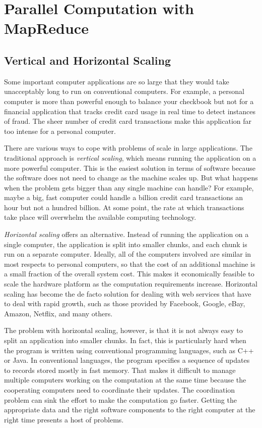 \chapter{Parallel Computation with MapReduce}

\section{Vertical and Horizontal Scaling}

Some important computer applications are so large that they would take
unacceptably long to run on conventional computers.  For
example, a personal computer is more than powerful enough
to balance your checkbook but not for a financial
application that tracks credit card usage in real time to
detect instances of fraud.  The sheer number of credit card
transactions make this application far too intense for a
personal computer.

There are various ways to cope
with problems of scale  in large applications.
The traditional approach is
\emph{vertical scaling},
which means running the
application on a more powerful computer.
This is the easiest solution in terms of software
because the software does not need to change as the machine scales up.
But what happens when the problem gets bigger than any single machine can handle?
For example, maybe a big, fast computer could handle
a billion credit card transactions an hour
but not a hundred billion.
At some point, the rate at which transactions take place
will overwhelm the available computing technology.

\emph{Horizontal scaling}
offers an alternative.  Instead of
running the application on a single computer,
the application is split into smaller
chunks, and each chunk is run on a separate computer.
Ideally, all of the computers involved are similar in most respects
to personal computers, so that the cost of an additional
machine is a small fraction of the overall system cost.
This makes it economically feasible to scale the
hardware platform as the computation requirements increase.
Horizontal scaling has become the de facto
solution for dealing with web services that have to deal
with rapid growth, such as those provided by
Facebook, Google, eBay, Amazon, Netflix, and many others.

The problem with horizontal scaling, however, is that it is
not always easy to split an application into smaller
chunks.  In fact, this is particularly hard when the program
is written using conventional programming languages, such as
C++ or Java. In conventional languages, the program specifies
a sequence of updates to records stored mostly in fast memory.
That makes it difficult to manage multiple computers
working on the computation at the same time because the
cooperating computers need to coordinate their updates.
The coordination problem can sink the effort to make
the computation go faster.
Getting the appropriate data and the right software
components to the right computer
at the right time presents a host of problems.

